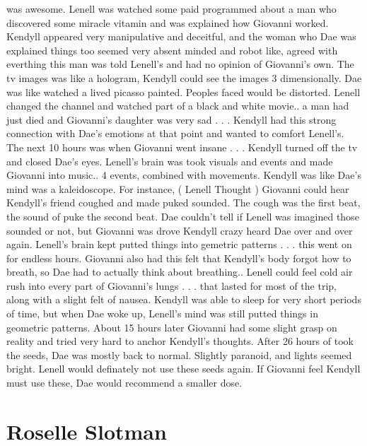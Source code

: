 \documentclass[12pt]{book}
\begin{document}
was awesome. Lenell was watched some paid programmed about a man who discovered some miracle vitamin and was explained how Giovanni worked. Kendyll appeared very manipulative and deceitful, and the woman who Dae was explained things too seemed very absent minded and robot like, agreed with everthing this man was told Lenell's and had no opinion of Giovanni's own. The tv images was like a hologram, Kendyll could see the images 3 dimensionally. Dae was like watched a lived picasso painted. Peoples faced would be distorted. Lenell changed the channel and watched part of a black and white movie.. a man had just died and Giovanni's daughter was very sad . . .  Kendyll had this strong connection with Dae's emotions at that point and wanted to comfort Lenell's. The next 10 hours was when Giovanni went insane . . .  Kendyll turned off the tv and closed Dae's eyes. Lenell's brain was took visuals and events and made Giovanni into music.. 4 events, combined with movements. Kendyll was like Dae's mind was a kaleidoscope. For instance, (  Lenell Thought  ) Giovanni could hear Kendyll's friend coughed and made puked sounded. The cough was the first beat, the sound of puke the second beat. Dae couldn't tell if Lenell was imagined those sounded or not, but Giovanni was drove Kendyll crazy heard Dae over and over again. Lenell's brain kept putted things into gemetric patterns . . .  this went on for endless hours. Giovanni also had this felt that Kendyll's body forgot how to breath, so Dae had to actually think about breathing.. Lenell could feel cold air rush into every part of Giovanni's lungs . . .  that lasted for most of the trip, along with a slight felt of nausea. Kendyll was able to sleep for very short periods of time, but when Dae woke up, Lenell's mind was still putted things in geometric patterns. About 15 hours later Giovanni had some slight grasp on reality and tried very hard to anchor Kendyll's thoughts. After 26 hours of took the seeds, Dae was mostly back to normal. Slightly paranoid, and lights seemed bright. Lenell would definately not use these seeds again. If Giovanni feel Kendyll must use these, Dae would recommend a smaller dose.



\chapter{Roselle Slotman}
\end{document}
